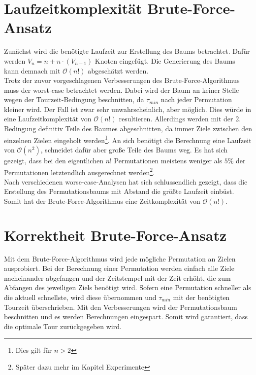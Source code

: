 \documentclass[german,version-2019-11]{uzl-thesis}
\begin{document}
\section{Laufzeitkomplexität Brute-Force-Ansatz}
Zunächst wird die benötigte Laufzeit zur Erstellung des Baums betrachtet. Dafür werden $V_n = n + n\cdot (V_{n-1})$ Knoten eingefügt. Die Generierung des Baums kann demnach mit $\mathcal{O}(n!)$ abgeschätzt werden. \\
Trotz der zuvor vorgeschlagenen Verbesserungen des Brute-Force-Algorithmus muss der worst-case betrachtet werden. Dabei wird der Baum an keiner Stelle wegen der Tourzeit-Bedingung  beschnitten, da $\tau_{min}$ nach jeder Permutation kleiner wird. Der Fall ist zwar sehr unwahrscheinlich, aber möglich. Dies würde in eine Laufzeitkomplexität von $\mathcal{O}(n!)$ resultieren. Allerdings werden mit der 2. Bedingung definitiv Teile des Baumes abgeschnitten, da immer Ziele zwischen den einzelnen Zielen eingeholt werden\footnote{Dies gilt für $n>2$}. An sich benötigt die Berechnung eine Laufzeit von $\mathcal{O}(n^2)$, schneidet dafür aber große Teile des Baums weg. Es hat sich gezeigt, dass bei den eigentlichen $n!$ Permutationen meistens weniger als $5\%$ der Permutationen letztendlich ausgerechnet werden\footnote{Später dazu mehr im Kapitel Experimente}. \\
Nach verschiedenen worse-case-Analysen hat sich schlussendlich gezeigt, dass die Erstellung des Permutationsbaums mit Abstand die größte Laufzeit einbüst. Somit hat der Brute-Force-Algorithmus eine Zeitkomplexität von $\mathcal{O}(n!)$.



\section{Korrektheit Brute-Force-Ansatz}
Mit dem Brute-Force-Algorithmus wird jede mögliche Permutation an Zielen ausprobiert. Bei der Berechnung einer Permutation werden einfach alle Ziele nacheinander abgefangen und der Zeitstempel mit der Zeit erhöht, die zum Abfangen des jeweiligen Ziels benötigt wird. Sofern eine Permutation schneller als die aktuell schnellste, wird diese übernommen und $\tau_{min}$ mit der benötigten Tourzeit überschrieben. Mit den Verbesserungen wird der Permutationsbaum beschnitten und es werden Berechnungen eingespart. Somit wird garantiert, dass die optimale Tour zurückgegeben wird.
\end{document}
